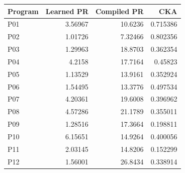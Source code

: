 \begin{center}\small
\begin{tabular}{@{}lrrr@{}}
\toprule
Program & Learned PR & Compiled PR & CKA \\
\midrule
P01 & 3.56967 & 10.6236 & 0.715386 \\
P02 & 1.01726 & 7.32466 & 0.802356 \\
P03 & 1.29963 & 18.8703 & 0.362354 \\
P04 & 4.2158 & 17.7164 & 0.45823 \\
P05 & 1.13529 & 13.9161 & 0.352924 \\
P06 & 1.54495 & 13.3776 & 0.497534 \\
P07 & 4.20361 & 19.6008 & 0.396962 \\
P08 & 4.57286 & 21.1789 & 0.355011 \\
P09 & 1.28516 & 17.3664 & 0.198811 \\
P10 & 6.15651 & 14.9264 & 0.400056 \\
P11 & 2.03145 & 14.8206 & 0.152299 \\
P12 & 1.56001 & 26.8434 & 0.338914 \\
\bottomrule
\end{tabular}
\end{center}
